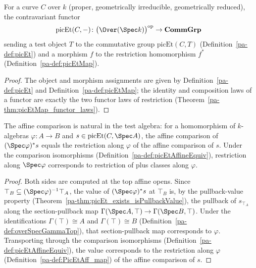 \begin{definition}
  \label{pa-def:picEtFunctor}
  \leanok

  For a curve \(C\) over \(k\) (proper, geometrically irreducible, geometrically reduced), the
  contravariant functor
  \[
    \mathrm{picEt}(C, -) \colon \bigl(\Over(\Spec k)\bigr)^{\mathrm{op}} \to \mathbf{CommGrp}
  \]
  sending a test object \(T\) to the commutative group \(\mathrm{picEt}(C, T)\)
  (Definition~\ref{pa-def:picEt}) and a morphism \(f\) to the restriction homomorphism \(f^{*}\)
  (Definition~\ref{pa-def:picEtMap}).
\end{definition}
\begin{proof}
  \leanok
  The object and morphism assignments are given by Definition~\ref{pa-def:picEt} and
  Definition~\ref{pa-def:picEtMap}; the identity and composition laws of a functor are exactly the two
  functor laws of restriction (Theorem~\ref{pa-thm:picEtMap_functor_laws}).
\end{proof}

\begin{theorem}
  \label{pa-thm:picEtAffineEquiv_naturality}
  \leanok

  The affine comparison is natural in the test algebra: for a homomorphism of \(k\)-algebras
  \(\varphi \colon A \to B\) and \(s \in \mathrm{picEt}(C, \Spec A)\), the affine comparison of
  \((\Spec\varphi)^{*}s\) equals the restriction along \(\varphi\) of the affine comparison of
  \(s\). Under the comparison isomorphisms (Definition~\ref{pa-def:picEtAffineEquiv}), restriction along
  \(\Spec\varphi\) corresponds to restriction of plus classes along \(\varphi\).
\end{theorem}
\begin{proof}
  \leanok
  Both sides are computed at the top affine opens. Since \(\top_B \subseteq (\Spec\varphi)^{-1}
  \top_A\), the value of \((\Spec\varphi)^{*}s\) at \(\top_B\) is, by the pullback-value property
  (Theorem~\ref{pa-thm:picEt_exists_isPullbackValue}), the pullback of \(s_{\top_A}\) along the
  section-pullback map \(\Gamma(\Spec A, \top) \to \Gamma(\Spec B, \top)\). Under the identifications
  \(\Gamma(\top) \cong A\) and \(\Gamma(\top) \cong B\) (Definition~\ref{pa-def:overSpecGammaTop}), that
  section-pullback map corresponds to \(\varphi\). Transporting through the comparison isomorphisms
  (Definition~\ref{pa-def:picEtAffineEquiv}), the value corresponds to the restriction along
  \(\varphi\) (Definition~\ref{pa-def:PicEtAff_map}) of the affine comparison of \(s\).
\end{proof}

